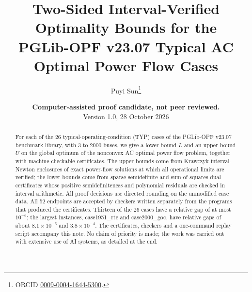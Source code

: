 \documentclass[10pt]{article}
\title{Two-Sided Interval-Verified Optimality Bounds for the\\ PGLib-OPF v23.07 Typical AC Optimal Power Flow Cases}
\author{Puyi Sun\thanks{ORCID \href{https://orcid.org/0009-0004-1644-5300}{0009-0004-1644-5300}.}}
\date{\textbf{Computer-assisted proof candidate, not peer reviewed.}\\ Version 1.0, 28 October 2026}
\begin{document}
\maketitle

\begin{abstract}
For each of the 26 typical-operating-condition (TYP) cases of the PGLib-OPF v23.07 benchmark library, with 3 to 2000
buses, we give a lower bound $L$ and an upper bound $U$ on the global optimum of the nonconvex AC optimal power flow
problem, together with machine-checkable certificates. The upper bounds come from Krawczyk interval-Newton enclosures of
exact power-flow solutions at which all operational limits are verified; the lower bounds come from sparse
semidefinite and sum-of-squares dual certificates whose positive semidefiniteness and polynomial residuals are checked in
interval arithmetic. All proof decisions use directed rounding on the unmodified case data. All 52 endpoints are accepted
by checkers written separately from the programs that produced the certificates. Thirteen of the 26 cases have a relative
gap of at most $10^{-6}$; the largest instances, case1951\_rte and case2000\_goc, have relative gaps of about
$8.1\times10^{-6}$ and $3.8\times10^{-4}$. The certificates, checkers and a one-command replay script accompany
this note. No claim of priority is made; the work was carried out with extensive use of AI systems, as detailed at the end.
\end{abstract}

\noindent{}
\end{document}
